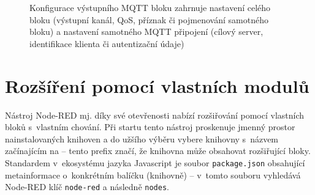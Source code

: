 \begin{figure}%
    \centering
    \hfill
    \caption{%
    Konfigurace výstupního MQTT bloku zahrnuje nastavení celého bloku (výstupní kanál, QoS, příznak 
    či pojmenování samotného bloku) a nastavení samotného MQTT připojení (cílový server, identifikace klienta či
    autentizační údaje)
    }%
    \label{fig:node-red-mqtt-out-conf}
\end{figure}


\section{Rozšíření pomocí vlastních modulů}\label{sec:node-red-rozsireni}

Nástroj Node-RED mj. díky své otevřenosti nabízí rozšiřování pomocí vlastních bloků s~vlastním
chování.
Při startu tento nástroj proskenuje jmenný prostor nainstalovaných knihoven a do užšího výběru vybere
knihovny s~názvem začínajícím na {} -- tento prefix značí, že knihovna může obsahovat
rozšiřující bloky. %
Standardem v~ekosystému jazyka Javascript je soubor \texttt{package.json} obsahující metainformace o~konkrétním
balíčku (knihovně) -- v~tomto souboru vyhledává Node-RED klíč \texttt{node-red} a následně \texttt{nodes}.

